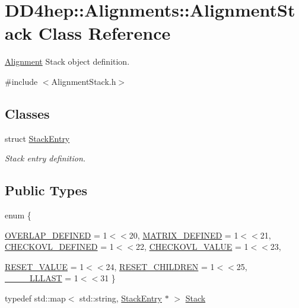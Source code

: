 \hypertarget{class_d_d4hep_1_1_alignments_1_1_alignment_stack}{
\section{DD4hep::Alignments::AlignmentStack Class Reference}
\label{class_d_d4hep_1_1_alignments_1_1_alignment_stack}
}


\hyperlink{class_d_d4hep_1_1_alignments_1_1_alignment}{Alignment} Stack object definition.  


{\ttfamily \#include $<$AlignmentStack.h$>$}\subsection*{Classes}
\begin{DoxyCompactItemize}
\item 
struct \hyperlink{struct_d_d4hep_1_1_alignments_1_1_alignment_stack_1_1_stack_entry}{StackEntry}
\begin{DoxyCompactList}\small\item\em Stack entry definition. \item\end{DoxyCompactList}\end{DoxyCompactItemize}
\subsection*{Public Types}
\begin{DoxyCompactItemize}
\item 
enum \{ \par
\hyperlink{class_d_d4hep_1_1_alignments_1_1_alignment_stack_a52684bf45771fe0444855e41ae789569a4033cb4255581775569f2e2f722aaa81}{OVERLAP\_\-DEFINED} =  1$<$$<$20, 
\hyperlink{class_d_d4hep_1_1_alignments_1_1_alignment_stack_a52684bf45771fe0444855e41ae789569a01f610d083823850012566acef4ec42b}{MATRIX\_\-DEFINED} =  1$<$$<$21, 
\hyperlink{class_d_d4hep_1_1_alignments_1_1_alignment_stack_a52684bf45771fe0444855e41ae789569aee39f024ccc317ee886361ffbe1f011b}{CHECKOVL\_\-DEFINED} =  1$<$$<$22, 
\hyperlink{class_d_d4hep_1_1_alignments_1_1_alignment_stack_a52684bf45771fe0444855e41ae789569a96646fe7ea980fd76a69495c22c271a4}{CHECKOVL\_\-VALUE} =  1$<$$<$23, 
\par
\hyperlink{class_d_d4hep_1_1_alignments_1_1_alignment_stack_a52684bf45771fe0444855e41ae789569ada369239b042e83f1b72c5a8885299ee}{RESET\_\-VALUE} =  1$<$$<$24, 
\hyperlink{class_d_d4hep_1_1_alignments_1_1_alignment_stack_a52684bf45771fe0444855e41ae789569aacd486a45b60924aec0660fa27eedb7f}{RESET\_\-CHILDREN} =  1$<$$<$25, 
\hyperlink{class_d_d4hep_1_1_alignments_1_1_alignment_stack_a52684bf45771fe0444855e41ae789569a22cc90a28cfb915750adda75ed6bfc1d}{\_\-\_\-\_\-\_\-LLLAST} =  1$<$$<$31
 \}
\item 
typedef std::map$<$ std::string, \hyperlink{struct_d_d4hep_1_1_alignments_1_1_alignment_stack_1_1_stack_entry}{StackEntry} $\ast$ $>$ \hyperlink{class_d_d4hep_1_1_alignments_1_1_alignment_stack_a14076338e30231119d5d291b5ac316ee}{Stack}
\end{DoxyCompactItemize}

